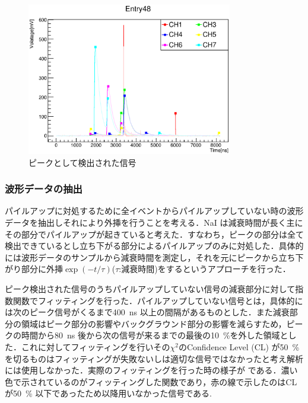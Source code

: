 \begin{figure}[hbt]
\centering
\includegraphics[width=0.8\textwidth]{figure/hatano/peakdata.eps}
\caption{ピークとして検出された信号}
\label{hatano_fig:peakdata}
\end{figure}

\subsubsection{波形データの抽出}
パイルアップに対処するために全イベントからパイルアップしていない時の波形データを抽出しそれにより外挿を行うことを考える．NaI は減衰時間が長く主にその部分でパイルアップが起きていると考えた．すなわち，ピークの部分は全て検出できているとし立ち下がる部分によるパイルアップのみに対処した．具体的には波形データのサンプルから減衰時間を測定し，それを元にピークから立ち下がり部分に外挿$\exp(-t/\tau)$($\tau$:減衰時間)をするというアプローチを行った．

ピーク検出された信号のうちパイルアップしていない信号の減衰部分に対して指数関数でフィッティングを行った．パイルアップしていない信号とは，具体的には次のピーク信号がくるまで400~ns 以上の間隔があるものとした．また減衰部分の領域はピーク部分の影響やバックグラウンド部分の影響を減らすため，ピークの時間から80~ns 後から次の信号が来るまでの最後の10~\%を外した領域とした．これに対してフィッティングを行いその$\chi^2$のConfidence Level (CL) が50~\% を切るものはフィッティングが失敗ないしは適切な信号ではなかったと考え解析には使用しなかった．実際のフィッティングを行った時の様子が である．濃い色で示されているのがフィッティングした関数であり，赤の線で示したのはCL が50~\% 以下であったため以降用いなかった信号である.

